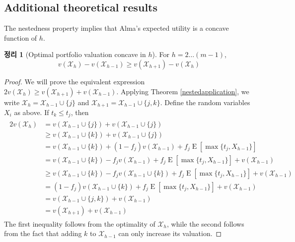 \documentclass[12pt]{article} %
\newtheorem{theorem}{Theorem}
\theoremstyle{definition}
\newtheorem{theorem}{정리}
\theoremstyle{definition}
\begin{document}
\subsection{Additional theoretical results}
The nestedness property implies that Alma's expected utility is a concave function of $h$.

\begin{theorem}[Optimal portfolio valuation concave in $h$] \label{concavityinh}
For $h = 2 \dots (m-1)$, \begin{equation}v(\mathcal{X}_h) - v(\mathcal{X}_{h-1}) \geq v(\mathcal{X}_{h+1}) - v(\mathcal{X}_{h})\end{equation} 
\end{theorem}
\begin{proof}
We will prove the equivalent expression $2 v(\mathcal{X}_h) \geq v(\mathcal{X}_{h+1}) + v(\mathcal{X}_{h-1})$. Applying Theorem \ref{nestedapplication}, we write $\mathcal{X}_h = \mathcal{X}_{h-1} \cup\{j\}$ and $\mathcal{X}_{h+1} = \mathcal{X}_{h-1} \cup\{j, k\}$. Define the random variables $X_i$ as above. If $t_k \leq t_j$, then 
\begin{align}
\begin{split}
2 v(\mathcal{X}_h) &= v(\mathcal{X}_{h-1} \cup\{j\}) + v(\mathcal{X}_{h-1} \cup\{j\}) \\
&\geq v(\mathcal{X}_{h-1} \cup\{k\}) + v(\mathcal{X}_{h-1} \cup\{j\}) \\
&= v(\mathcal{X}_{h-1} \cup\{k\}) + (1 - f_j) v(\mathcal{X}_{h-1}) + f_j \operatorname{E}[\max\{t_j, X_{h-1}\}] \\
&= v(\mathcal{X}_{h-1} \cup\{k\}) - f_j v(\mathcal{X}_{h-1}) + f_j \operatorname{E}[\max\{t_j, X_{h-1}\}] + v(\mathcal{X}_{h-1})  \\
&\geq v(\mathcal{X}_{h-1} \cup\{k\})  - f_j v(\mathcal{X}_{h-1}\cup\{k\}) + f_j \operatorname{E}[\max\{t_j, X_{h-1}\}]+ v(\mathcal{X}_{h-1})\\
&= (1 - f_j) v(\mathcal{X}_{h-1} \cup\{k\})  + f_j \operatorname{E}[\max\{t_j, X_{h-1}\}]+ v(\mathcal{X}_{h-1})\\
&=  v(\mathcal{X}_{h-1} \cup\{j, k\}) + v(\mathcal{X}_{h-1})\\
&=  v(\mathcal{X}_{h+1}) + v(\mathcal{X}_{h-1})
\end{split} 
\end{align}
The first inequality follows from the optimality of $\mathcal{X}_h$, while the second follows from the fact that adding $k$ to $\mathcal{X}_{h-1}$ can only increase its valuation.


\end{proof}
\end{document}
